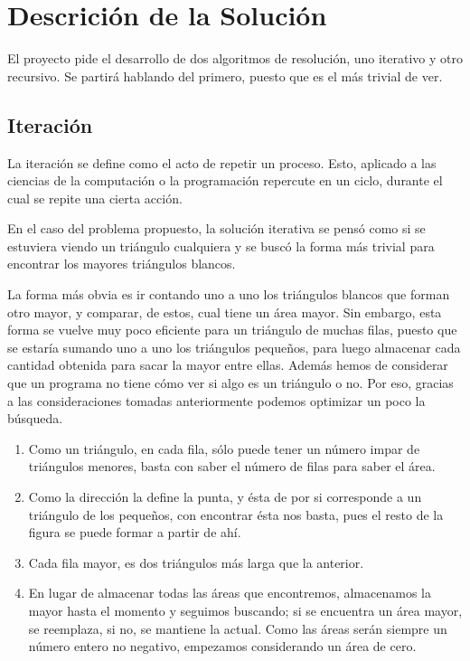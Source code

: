 \documentclass[letterpaper]{article}
\begin{document}
  \newpage
  \section{Descrici\'on de la Soluci\'on}
  El proyecto pide el desarrollo de dos algoritmos de resoluci\'on, uno iterativo
  y otro recursivo. Se partir\'a hablando del primero, puesto que es el m\'as trivial
  de ver.
  \subsection{Iteraci\'on}
  La iteraci\'on se define como el acto de repetir un proceso. Esto, aplicado a las
  ciencias de la computaci\'on o la programaci\'on repercute en un ciclo, durante
  el cual se repite una cierta acci\'on.\par
  En el caso del problema propuesto, la soluci\'on iterativa se pens\'o como si
  se estuviera viendo un tri\'angulo cualquiera y se busc\'o la forma m\'as trivial
  para encontrar los mayores tri\'angulos blancos.\par
  La forma m\'as obvia es ir contando uno a uno los tri\'angulos blancos que forman
  otro mayor, y comparar, de estos, cual tiene un \'area mayor. Sin embargo, esta
  forma se vuelve muy poco eficiente para un tri\'angulo de muchas filas, puesto
  que se estar\'ia sumando uno a uno los tri\'angulos peque\~nos, para luego almacenar
  cada cantidad obtenida para sacar la mayor entre ellas. Adem\'as hemos de considerar
  que un programa no tiene c\'omo ver si algo es un tri\'angulo o no. Por eso, gracias
  a las consideraciones tomadas anteriormente podemos optimizar un poco la b\'usqueda.
  \begin{enumerate}
    \item Como un tri\'angulo, en cada fila, s\'olo puede tener un n\'umero impar de
    tri\'angulos menores, basta con saber el n\'umero de filas para saber el \'area.
    \item Como la direcci\'on la define la punta, y \'esta de por si corresponde a
    un tri\'angulo de los peque\~nos, con encontrar \'esta nos basta, pues el resto de la
    figura se puede formar a partir de ah\'i.
    \item Cada fila mayor, es dos tri\'angulos m\'as larga que la anterior.
    \item En lugar de almacenar todas las \'areas que encontremos, almacenamos la
    mayor hasta el momento y seguimos buscando; si se encuentra un \'area mayor, se
    reemplaza, si no, se mantiene la actual. Como las \'areas ser\'an siempre un
    n\'umero entero no negativo, empezamos considerando un \'area de cero.
  \end{enumerate}
\end{document}
